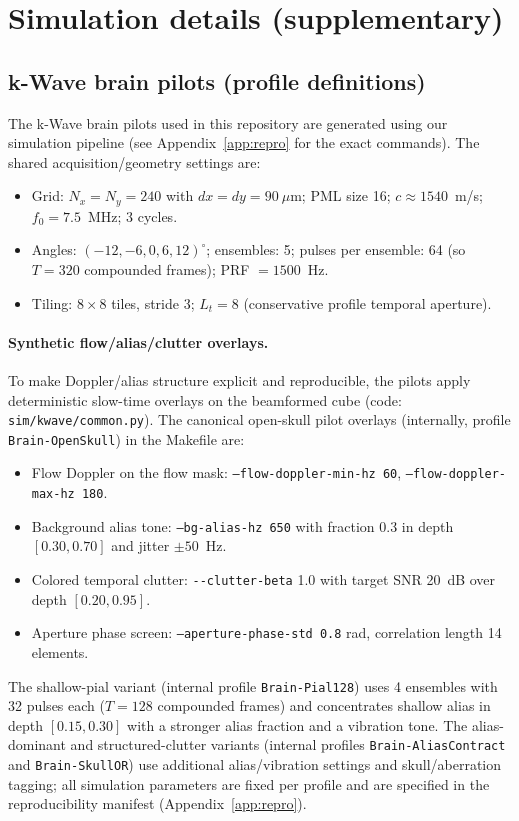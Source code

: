 \documentclass[11pt]{article}
\DeclareRobustCommand{\path}[1]{\nolinkurl{#1}}
\newif\ifSTAPPAPERONLY
\newcommand{\SuppOrApp}[1]{\ifSTAPPAPERONLY Supplementary Material\else Appendix~\ref{#1}\fi}
\begin{document}
\section{Simulation details (supplementary)}
\label{app:sim-details}
\subsection{k-Wave brain pilots (profile definitions)}
The k-Wave brain pilots used in this repository are generated using our simulation pipeline (see \SuppOrApp{app:repro} for the exact commands). The shared acquisition/geometry settings are:
\begin{itemize}[nosep]
  \item Grid: $N_x=N_y=240$ with $dx=dy=90~\mu$m; PML size 16; $c\approx 1540$~m/s; $f_0=7.5$~MHz; 3 cycles.
  \item Angles: $(-12,-6,0,6,12)^\circ$; ensembles: 5; pulses per ensemble: 64 (so $T=320$ compounded frames); PRF $=1500$~Hz.
  \item Tiling: $8\times 8$ tiles, stride 3; $L_t=8$ (conservative profile temporal aperture).
\end{itemize}
\paragraph{Synthetic flow/alias/clutter overlays.}
To make Doppler/alias structure explicit and reproducible, the pilots apply deterministic slow-time overlays on the beamformed cube (code: \path{sim/kwave/common.py}). The canonical open-skull pilot overlays (internally, profile \texttt{Brain-OpenSkull}) in the Makefile are:
\begin{itemize}[nosep]
  \item Flow Doppler on the flow mask: \texttt{--flow-doppler-min-hz 60}, \texttt{--flow-doppler-max-hz 180}.
  \item Background alias tone: \texttt{--bg-alias-hz 650} with fraction 0.3 in depth $[0.30,0.70]$ and jitter $\pm 50$~Hz.
  \item Colored temporal clutter: \path{--clutter-beta} 1.0 with target SNR 20~dB over depth $[0.20,0.95]$.
  \item Aperture phase screen: \texttt{--aperture-phase-std 0.8} rad, correlation length 14 elements.
\end{itemize}
The shallow-pial variant (internal profile \texttt{Brain-Pial128}) uses 4 ensembles with 32 pulses each ($T=128$ compounded frames) and concentrates shallow alias in depth $[0.15,0.30]$ with a stronger alias fraction and a vibration tone. The alias-dominant and structured-clutter variants (internal profiles \texttt{Brain-AliasContract} and \texttt{Brain-SkullOR}) use additional alias/vibration settings and skull/aberration tagging; all simulation parameters are fixed per profile and are specified in the reproducibility manifest (\SuppOrApp{app:repro}).
\end{document}
